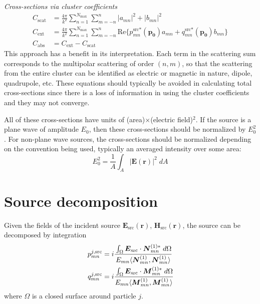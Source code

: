 \documentclass[11pt]{article}
\begin{document}
\hfill

\textit{Cross-sections via cluster coefficients} \cite{xu1995electromagnetic}
\begin{subequations}
\begin{align}
    C_\text{scat} &= \frac{4\pi}{k^2} \sum_{n=1}^{N_\text{max}} \sum_{m=-n}^{n}
    |a_{mn}|^2 + |b_{mn}|^2 \\
    C_\text{ext} &= \frac{4\pi}{k^2} \sum_{n=1}^{N_\text{max}} \sum_{m=-n}^{n}
    \text{Re} \bigg\{ p_{mn}^{\text{src}*}(\boldsymbol{p_0}) a_{mn} 
    + q_{mn}^{\text{src}*}(\boldsymbol{p_0})b_{mn} \bigg\} \\
    C_\text{abs} &= C_\text{ext} - C_\text{scat}
\end{align}
\end{subequations}
This approach has a benefit in its interpretation.
Each term in the scattering sum corresponds to the multipolar scattering of order $(n,m)$, so that the scattering from the entire cluster can be identified as electric or magnetic in nature, dipole, quadrupole, etc.
These equations should typically be avoided in calculating total cross-sections since there is a loss of information in using the cluster coefficients and they may not converge.

All of these cross-sections have units of (area)$\times$(electric field)$^2$.
If the source is a plane wave of amplitude $E_0$, then these cross-sections should be normalized by $E_0^2$.
For non-plane wave sources, the cross-sections should be normalized depending on the convention being used, typically an averaged intensity over some area:
\begin{equation}
    E_0^2 = \frac{1}{A} \int_A |\boldsymbol{E}(\boldsymbol{r})|^2 \;dA
\end{equation}

\section{Source decomposition}
Given the fields of the incident source $\boldsymbol{E}_\text{src}(\boldsymbol{r})$, $\boldsymbol{H}_\text{src}(\boldsymbol{r})$, the source can be decomposed by integration
\begin{align}
\begin{split}
    p_{mn}^{j,\text{src}} &= i\cfrac{\int_\Omega \boldsymbol{E}_\text{src} \cdot \boldsymbol{N}_{mn}^{(1)*} \; d\Omega}
    {E_{mn} \langle \boldsymbol{N}_{mn}^{(1)},\boldsymbol{N}_{mn}^{(1)} \rangle} \\
    q_{mn}^{j,\text{src}} &= i\cfrac{\int_\Omega \boldsymbol{E}_\text{src} \cdot \boldsymbol{M}_{mn}^{(1)*} \; d\Omega}
    {E_{mn} \langle \boldsymbol{M}_{mn}^{(1)},\boldsymbol{M}_{mn}^{(1)} \rangle}
\end{split}
\end{align}
where $\Omega$ is a closed surface around particle $j$.
\end{document}
